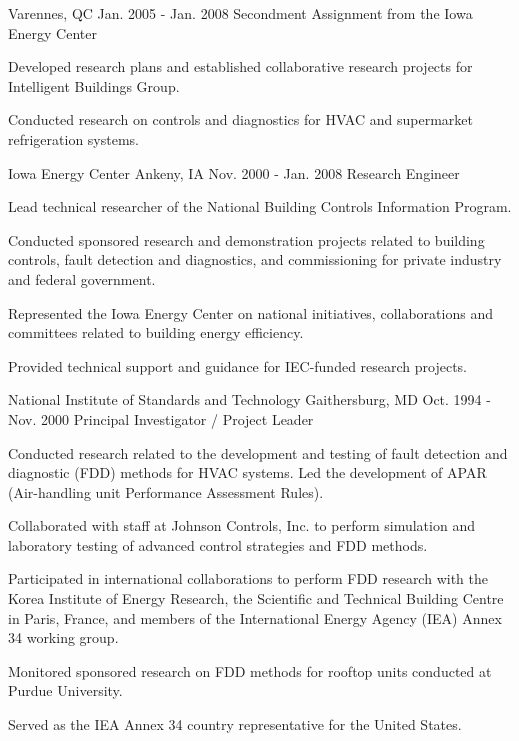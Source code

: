 \begin{cventries}
{Varennes, QC} %
{Jan. 2005 - Jan. 2008} %
{Secondment Assignment from the Iowa Energy Center} %
{
\begin{cvitems} %
\item {Developed research plans and established collaborative research projects for Intelligent Buildings Group.}
\item {Conducted research on controls and diagnostics for HVAC and supermarket refrigeration systems.}
\end{cvitems}
}
\cventry
{Iowa Energy Center} %
{Ankeny, IA} %
{Nov. 2000 - Jan. 2008} %
{Research Engineer} %
{
\begin{cvitems} %
\item {Lead technical researcher of the National Building Controls Information Program.}
\item {Conducted sponsored research and demonstration projects related to building controls, fault detection and diagnostics, and commissioning for private industry and federal government.}
\item {Represented the Iowa Energy Center on national initiatives, collaborations and committees related to building energy efficiency.}
\item {Provided technical support and guidance for IEC-funded research projects.}
\end{cvitems}
}
\cventry
{National Institute of Standards and Technology} %
{Gaithersburg, MD} %
{Oct. 1994 - Nov. 2000} %
{Principal Investigator / Project Leader} %
{
\begin{cvitems} %
\item {Conducted research related to the development and testing of fault detection and diagnostic (FDD) methods for HVAC systems. Led the development of APAR (Air-handling unit Performance Assessment Rules).}
\item {Collaborated with staff at Johnson Controls, Inc. to perform simulation and laboratory testing of advanced control strategies and FDD methods.}
\item {Participated in international collaborations to perform FDD research with the Korea Institute of Energy Research, the Scientific and Technical Building Centre in Paris, France, and members of the International Energy Agency (IEA) Annex 34 working group.}
\item {Monitored sponsored research on FDD methods for rooftop units conducted at Purdue University.}
\item {Served as the IEA Annex 34 country representative for the United States.}
\end{cvitems}
}
\end{cventries}
